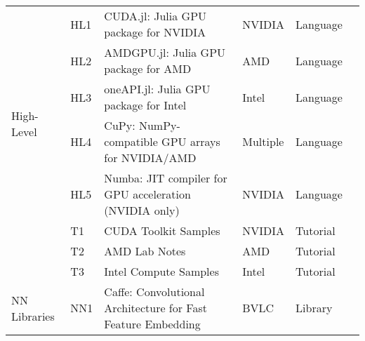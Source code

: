 \begin{table*}[htbp]
\begin{tabular}{llp{8cm}lll}
		\hline
		\multirow{6}{*}{\small High-Level}
		                         & \small HL1         & \small CUDA.jl: Julia GPU package for NVIDIA                                          & \small NVIDIA          & \small Language      & \small \cite{noauthor_juliagpucudajl_2025}            \\[1ex]
		                         & \small HL2         & \small AMDGPU.jl: Julia GPU package for AMD                                           & \small AMD             & \small Language      & \small \cite{noauthor_juliagpuamdgpujl_2025}          \\[1ex]
		                         & \small HL3         & \small oneAPI.jl: Julia GPU package for Intel                                         & \small Intel           & \small Language      & \small \cite{besard_oneapijl_2022}                    \\[1ex]
		                         & \small HL4         & \small CuPy: NumPy-compatible GPU arrays for NVIDIA/AMD                               & \small Multiple        & \small Language      & \small \cite{okuta_cupy_2017, noauthor_cupycupy_2025} \\[1ex]
		                         & \small HL5         & \small Numba: JIT compiler for GPU acceleration (NVIDIA only)                         & \small NVIDIA          & \small Language      & \small \cite{noauthor_numbanumba_2025}                \\
		\hline
		\multirow{4}{*}{\small Tutorials}
		                         & \small T1          & \small CUDA Toolkit Samples                                                           & \small NVIDIA          & \small Tutorial      & \small \cite{noauthor_nvidiacuda-samples_2025}        \\[1ex]
		                         & \small T2          & \small AMD Lab Notes                                                                  & \small AMD             & \small Tutorial      & \small \cite{noauthor_amdamd-lab-notes_2025}          \\[1ex]
		                         & \small T3          & \small Intel Compute Samples                                                          & \small Intel           & \small Tutorial      & \small \cite{noauthor_intelcompute-samples_2025}      \\
		\hline
		\multirow{5}{*}{\small NN Libraries}
		                         & \small NN1         & \small Caffe: Convolutional Architecture for Fast Feature Embedding                   & \small BVLC            & \small Library       & \small \cite{Jia.EtAl_2014a}                          \\[1ex]

\end{tabular}
\end{table*}
